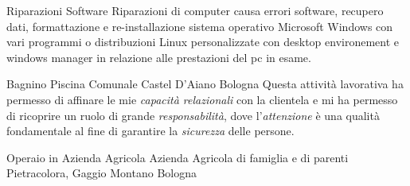 {Riparazioni Software}
{}
{}
{}
{Riparazioni di computer causa errori software, recupero dati, formattazione e
re-installazione sistema operativo Microsoft Windows con vari programmi o
distribuzioni Linux personalizzate con desktop environement e windows manager in
relazione alle prestazioni del pc in esame.}

{Bagnino}
{Piscina Comunale}
{Castel D'Aiano}
{Bologna}
{Questa attività lavorativa ha permesso di affinare le mie \textit{capacità
relazionali} con la clientela e mi ha permesso di ricoprire un ruolo di grande
\textit{responsabilità}, dove l'\textit{attenzione} è una qualità fondamentale
al fine di garantire la \textit{sicurezza} delle persone.}

{Operaio in Azienda Agricola}
{Azienda Agricola di famiglia e di parenti}
{Pietracolora, Gaggio Montano}
{Bologna}
{}
